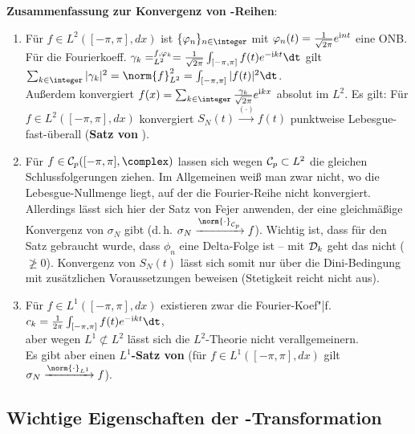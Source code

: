 \linie

\textbf{Zusammenfassung zur Konvergenz von -Reihen}:
\begin{enumerate}
    \item
    Für $f \in L^2([-\pi, \pi], dx)$ ist $\{\varphi_n\}_{n \in \integer}$
    mit $\varphi_n(t) = \frac{1}{\sqrt{2\pi}} e^{\mathrm{i} nt}$ eine ONB.
    Für die Fourierkoeff. $\gamma_k = \sp{f, \varphi_k}_{L^2} =
    \frac{1}{\sqrt{2\pi}} \int_{[-\pi, \pi]} f(t) e^{-\i kt}\dt$ gilt
    $\sum_{k \in \integer} |\gamma_k|^2 = \norm{f}_{L^2}^2 =
    \int_{[-\pi, \pi]} |f(t)|^2 \dt$.\\
    Außerdem konvergiert $f(x) = \sum_{k \in \integer}
    \frac{\gamma_k}{\sqrt{2\pi}} e^{\i kx}$ absolut im $L^2$.
    Es gilt:
    Für $f \in L^2([-\pi, \pi], dx)$ konvergiert
    $S_N(t) \xrightarrow{(\cdot)} f(t)$ punktweise Lebesgue-fast-überall
    (\textbf{Satz von }).

    \item
    Für $f \in \C_p([-\pi, \pi], \complex)$ lassen sich wegen
    $\mathcal{C}_p \subset L^2$ die gleichen Schlussfolgerungen ziehen.
    Im Allgemeinen weiß man zwar nicht, wo die Lebesgue-Nullmenge liegt,
    auf der die Fourier-Reihe nicht konvergiert.
    Allerdings lässt sich hier der Satz von Fejer anwenden, der eine
    gleichmäßige Konvergenz von $\sigma_N$ gibt
    (d.\,h. $\sigma_N \xrightarrow{\norm{\cdot}_{\C_p}} f$).
    Wichtig ist, dass für den Satz gebraucht wurde, dass $\phi_n$ eine
    Delta-Folge ist -- mit $\mathcal{D}_k$ geht das nicht ($\not\ge 0$).
    Konvergenz von $S_N(t)$ lässt sich somit nur über die Dini-Bedingung mit
    zusätzlichen Voraussetzungen beweisen (Stetigkeit reicht nicht aus).

    \item
    Für $f \in L^1([-\pi, \pi], dx)$ existieren zwar die
    Fourier-Koef"|f.
    $c_k = \frac{1}{2\pi} \int_{[-\pi, \pi]} f(t) e^{-\i kt} \dt$,\\
    aber wegen $L^1 \not\subset L^2$ lässt sich die $L^2$-Theorie nicht
    verallgemeinern.\\
    Es gibt aber einen \textbf{$L^1$-Satz von }
    (für $f \in L^1([-\pi, \pi], dx)$ gilt
    $\sigma_N \xrightarrow{\norm{\cdot}_{L^1}} f$).
\end{enumerate}

\subsection{%
    Wichtige Eigenschaften der -Transformation%
}

